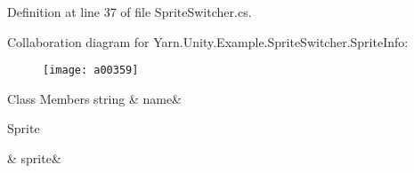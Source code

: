 Definition at line 37 of file Sprite\-Switcher.\-cs.



Collaboration diagram for Yarn.\-Unity.\-Example.\-Sprite\-Switcher.\-Sprite\-Info\-:
\nopagebreak
\begin{figure}[H]
\begin{center}
\leavevmode
\texttt{[image: a00359]}
\end{center}
\end{figure}
\begin{DoxyFields}{Class Members}
\hypertarget{a00146_a3f5bca2fff413dfe075c1fcf7e58369c}{string}\label{a00146_a3f5bca2fff413dfe075c1fcf7e58369c}
&
name&
\\
\hline

\hypertarget{a00146_adc58df011dc2841837b6cf775b372061}{Sprite}\label{a00146_adc58df011dc2841837b6cf775b372061}
&
sprite&
\\
\hline

\end{DoxyFields}
